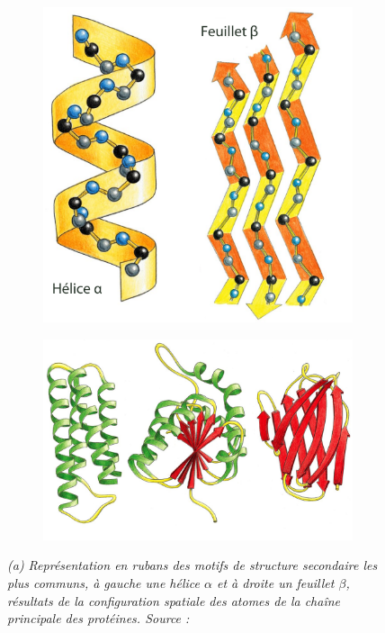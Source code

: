 \begin{figure}[h]
  \begin{subfigure}{.5\textwidth}
  \centering
  {\includegraphics[width=0.9\linewidth]{./figures/ch1/secondary_structure.png}}
    \caption{}
    \label{Fig:secondary_structure}
  \hspace{0.2cm}
  \end{subfigure}
  \begin{subfigure}{.5\textwidth}
  \centering
  {\includegraphics[width=0.9\linewidth]{./figures/ch1/tertiary_structure.jpg}}
    \caption{}
    \label{Fig:tertiary_structure}
  \hspace{0.2cm}
  \end{subfigure}
  \caption[(a) Représentation en rubans des motifs de structure secondaire. (b) Exemples de motifs communs de structures tertiaires.]{\it (a) Représentation en rubans des motifs de structure secondaire les plus communs, à gauche une hélice $\alpha$ et à droite un feuillet $\beta$, résultats de la configuration spatiale des atomes de la chaîne principale des protéines. Source : \cite{alberts2013essential}
}
\end{figure}
